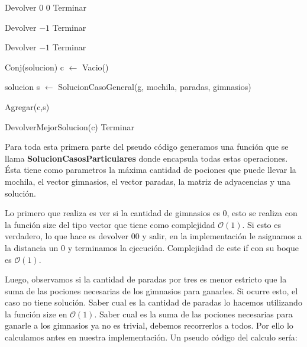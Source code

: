 \begin{algorithm}[H]
\label{}
\begin{algorithmic}[]

	\State Devolver $0$ $0$
	\State Terminar
\EndIf

	\State Devolver $-1$
	\State Terminar
\EndIf

	\State Devolver $-1$
	\State Terminar
\EndIf


	\State Conj(solucion) c $\leftarrow$ Vacio()


		\State solucion s $\leftarrow$ SolucionCasoGeneral(g, mochila, paradas, gimnasios)

		\State Agregar(c,s)

	\EndFor

	\State DevolverMejorSolucion(c)
	\State Terminar
\EndIf

\medskip
\Statex \underline{}
\end{algorithmic}
\end{algorithm}

Para toda esta primera parte del pseudo código generamos una función que se llama \textbf{SolucionCasosParticulares} donde encapsula todas estas operaciones. Ésta tiene como parametros la máxima cantidad de pociones que puede llevar la mochila, el vector gimnasios, el vector paradas, la matriz de adyacencias y una solución.

Lo primero que realiza es ver si la cantidad de gimnasios es $0$, esto se realiza con la función size del tipo vector que tiene como complejidad $\mathcal{O}(1)$. Si esto es verdadero, lo que hace es devolver $0 0$ y salir, en la implementación le asignamos a la distancia un $0$ y terminamos la ejecución. Complejidad de este if con su boque es $\mathcal{O}(1)$.

Luego, observamos si la cantidad de paradas por tres es menor estricto que la suma de las pociones necesarias de los gimnasios para ganarles. Si ocurre esto, el caso no tiene solución. Saber cual es la cantidad de paradas lo hacemos utilizando la función size en $\mathcal{O}(1)$. Saber cual es la suma de las pociones necesarias para ganarle a los gimnasios ya no es trivial, debemos recorrerlos a todos. Por ello lo calculamos antes en nuestra implementación. Un pseudo código del calculo sería:

